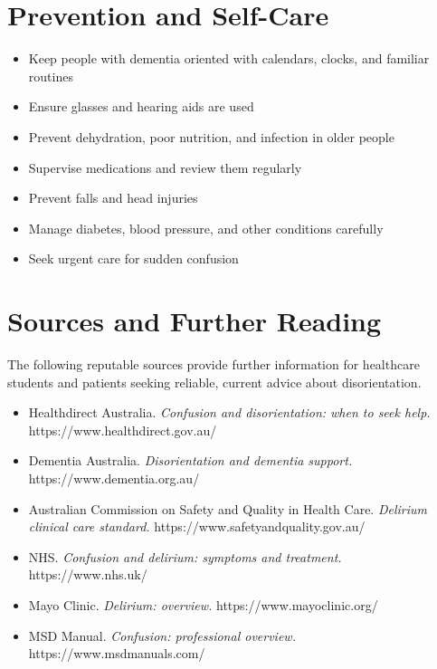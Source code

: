 \section*{Prevention and Self-Care}
\begin{itemize}
    \item Keep people with dementia oriented with calendars, clocks, and familiar routines
    \item Ensure glasses and hearing aids are used
    \item Prevent dehydration, poor nutrition, and infection in older people
    \item Supervise medications and review them regularly
    \item Prevent falls and head injuries
    \item Manage diabetes, blood pressure, and other conditions carefully
    \item Seek urgent care for sudden confusion
\end{itemize}

\section*{Sources and Further Reading}
The following reputable sources provide further information for healthcare students and patients seeking reliable, current advice about disorientation.

\begin{itemize}
    \item Healthdirect Australia. \textit{Confusion and disorientation: when to seek help.} https://www.healthdirect.gov.au/
    \item Dementia Australia. \textit{Disorientation and dementia support.} https://www.dementia.org.au/
    \item Australian Commission on Safety and Quality in Health Care. \textit{Delirium clinical care standard.} https://www.safetyandquality.gov.au/
    \item NHS. \textit{Confusion and delirium: symptoms and treatment.} https://www.nhs.uk/
    \item Mayo Clinic. \textit{Delirium: overview.} https://www.mayoclinic.org/
    \item MSD Manual. \textit{Confusion: professional overview.} https://www.msdmanuals.com/
\end{itemize}
